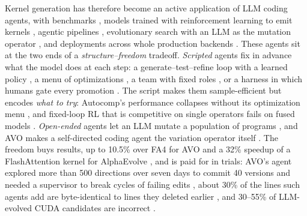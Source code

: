 Kernel generation has therefore become an active application of LLM coding agents, with benchmarks
\cite{kernelbench,xing2026flashinferbench,solexecbench,oliaro2026fastkernels},
models trained with reinforcement learning to emit kernels
\cite{baronio2025kevin,li2025cudal1,cudaagent2026,drkernel}, agentic pipelines
\cite{hong2025autocomp,wei2025astra,kernelskill2026}, evolutionary search with an LLM as the mutation
operator \cite{alphaevolve,lange2025shinkaevolve,chen2026avo}, and deployments across
whole production backends \cite{liao2025kernelevolve,cursor2026multiagent}. These agents sit at the
two ends of a \emph{structure--freedom} tradeoff. \emph{Scripted} agents fix in advance what the
model does at each step: a generate--test--refine loop with a learned policy
\cite{baronio2025kevin,li2025cudal1,drkernel}, a menu of optimizations \cite{hong2025autocomp},
a team with fixed roles \cite{wei2025astra,kernelskill2026}, or a harness in which humans gate every
promotion \cite{shui2026harness}. The script makes them sample-efficient but encodes \emph{what to
try}: Autocomp's performance collapses without its optimization menu \cite{hong2025autocomp}, and
fixed-loop RL that is competitive on single operators fails on fused models
\cite{drkernel,zhu2026qimeng,cudaagent2026}. \emph{Open-ended} agents let an LLM mutate a
population of programs
\cite{romeraparedes2024funsearch,alphaevolve,lange2025shinkaevolve,guo2025evoengineer,wiedemann2026kernelfoundry},
and AVO makes a self-directed coding agent the variation operator itself \cite{chen2026avo}. The
freedom buys results, up to 10.5\% over FA4 for AVO \cite{chen2026avo} and a 32\% speedup of a
FlashAttention kernel for AlphaEvolve \cite{alphaevolve}, and is paid for in trials: AVO's
agent explored more than 500 directions over seven days to commit 40 versions and needed a
supervisor to break cycles of failing edits \cite{chen2026avo}, about 30\% of the lines such agents
add are byte-identical to lines they deleted earlier \cite{pelleriti2026evotrace}, and 30--55\% of
LLM-evolved CUDA candidates are incorrect \cite{guo2025evoengineer,cuco2026}.

